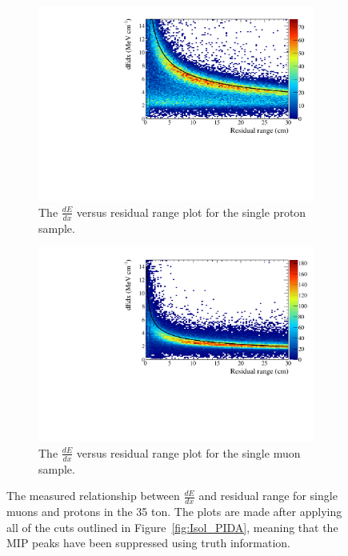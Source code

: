 \begin{figure}[h!]
  \centering
  \begin{subfigure}{.45\textwidth}
        \centering
        \includegraphics[width=\textwidth]{IsolatedProtons_500V_Dec16_Proton_dEdx}
        \caption{The $\frac{dE}{dx}$ versus residual range plot for the single proton sample.}
        \label{fig:Isol_dEdx_Proton}
  \end{subfigure}
  \hspace{0.08\textwidth}
  \begin{subfigure}{.45\textwidth}
        \centering
        \includegraphics[width=\textwidth]{IsolatedMuons_500V_Dec16_Muon_dEdx}
        \caption{The $\frac{dE}{dx}$ versus residual range plot for the single muon sample.}
        \label{fig:Isol_dEdx_Muon}
  \end{subfigure}
  \caption[The $\frac{dE}{dx}$ versus residual range plot for single muons and protons in the 35 ton.]
          {The measured relationship between $\frac{dE}{dx}$ and residual range for single muons and protons in the 35 ton. The plots are made after applying all of the cuts outlined in Figure~\ref{fig:Isol_PIDA}, meaning that the MIP peaks have been suppressed using truth information.}
  \label{fig:Isol_dEdx}
\end{figure}


